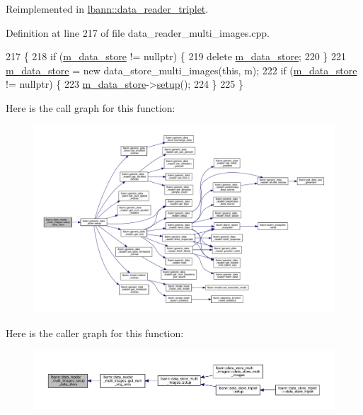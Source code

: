 Reimplemented in \hyperlink{classlbann_1_1data__reader__triplet_a2cd6fd46a7d2d90ccd754404683834c6}{lbann\+::data\+\_\+reader\+\_\+triplet}.



Definition at line 217 of file data\+\_\+reader\+\_\+multi\+\_\+images.\+cpp.


\begin{DoxyCode}
217                                                         \{
218   \textcolor{keywordflow}{if} (\hyperlink{classlbann_1_1generic__data__reader_aefc076b842933a882214f4f709ca49c9}{m\_data\_store} != \textcolor{keyword}{nullptr}) \{
219     \textcolor{keyword}{delete} \hyperlink{classlbann_1_1generic__data__reader_aefc076b842933a882214f4f709ca49c9}{m\_data\_store};
220   \}
221   \hyperlink{classlbann_1_1generic__data__reader_aefc076b842933a882214f4f709ca49c9}{m\_data\_store} = \textcolor{keyword}{new} data\_store\_multi\_images(\textcolor{keyword}{this}, m);
222   \textcolor{keywordflow}{if} (\hyperlink{classlbann_1_1generic__data__reader_aefc076b842933a882214f4f709ca49c9}{m\_data\_store} != \textcolor{keyword}{nullptr}) \{
223     \hyperlink{classlbann_1_1generic__data__reader_aefc076b842933a882214f4f709ca49c9}{m\_data\_store}->\hyperlink{classlbann_1_1generic__data__store_a1cff17def02ee21b6ca0befeb04bb582}{setup}();
224   \}
225 \}
\end{DoxyCode}
Here is the call graph for this function\+:\nopagebreak
\begin{figure}[H]
\begin{center}
\leavevmode
\includegraphics[width=350pt]{classlbann_1_1data__reader__multi__images_ac4c70724fe5f1378a81394cc2e686297_cgraph}
\end{center}
\end{figure}
Here is the caller graph for this function\+:\nopagebreak
\begin{figure}[H]
\begin{center}
\leavevmode
\includegraphics[width=350pt]{classlbann_1_1data__reader__multi__images_ac4c70724fe5f1378a81394cc2e686297_icgraph}
\end{center}
\end{figure}



